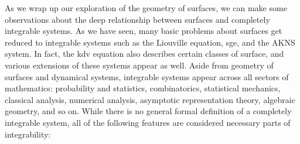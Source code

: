As we wrap up our exploration of the geometry of surfaces, we can make some observations about the deep relationship between surfaces and completely integrable systems. As we have seen, many basic problems about surfaces get reduced to integrable systems such as the Liouville equation, \gls{sge}, and the AKNS system. In fact, the \gls{kdv} equation also describes certain classes of surface, and various extensions of these systems appear as well. Aside from geometry of surfaces and dynamical systems, integrable systems appear across all sectors of mathematics: probability and statistics, combinatorics, statistical mechanics, classical analysis, numerical analysis, asymptotic representation theory, algebraic geometry, and so on. While there is no general formal definition of a completely integrable system, all of the following features are considered necessary parts of integrability:
